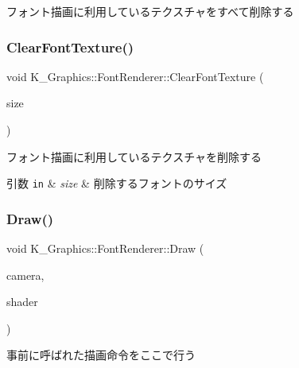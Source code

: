フォント描画に利用しているテクスチャをすべて削除する 

\mbox{\label{class_k___graphics_1_1_font_renderer_ace5f43f6cbd1a5b18e41350ca2e64dea}} 
\subsubsection{\texorpdfstring{Clear\+Font\+Texture()}{ClearFontTexture()}}
{\footnotesize\ttfamily void K\+\_\+\+Graphics\+::\+Font\+Renderer\+::\+Clear\+Font\+Texture (\begin{DoxyParamCaption}\item[{int}]{size }\end{DoxyParamCaption})}



フォント描画に利用しているテクスチャを削除する 


\begin{DoxyParams}[1]{引数}
\mbox{\tt in}  & {\em size} & 削除するフォントのサイズ \\
\hline
\end{DoxyParams}
\mbox{\label{class_k___graphics_1_1_font_renderer_a90ee7dabacdc9c324b6e422cd7402b89}} 
\subsubsection{\texorpdfstring{Draw()}{Draw()}}
{\footnotesize\ttfamily void K\+\_\+\+Graphics\+::\+Font\+Renderer\+::\+Draw (\begin{DoxyParamCaption}\item[{\mbox{\hyperlink{class_k___graphics_1_1_camera_class}{Camera\+Class}} $\ast$}]{camera,  }\item[{\mbox{\hyperlink{class_k___graphics_1_1_shader_class}{Shader\+Class}} $\ast$}]{shader }\end{DoxyParamCaption})}



事前に呼ばれた描画命令をここで行う 


